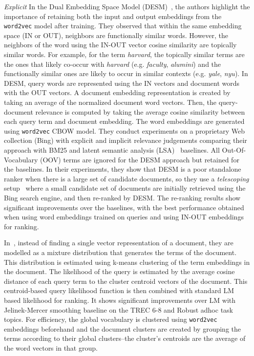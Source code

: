 \textit{Explicit} In the \textsf{Dual Embedding Space Model} (DESM)~\citep{Mitra2016a, Nalisnick:2016}, the authors highlight the importance of retaining both the input and output embeddings from the \texttt{word2vec} model after training. They observed that within the same embedding space (IN or OUT), neighbors are functionally similar words. However, the neighbors of the word using the IN-OUT vector cosine similarity are topically similar words. %
For example, for the term \textit{harvard}, the topically similar terms are the ones that likely co-occur with \textit{harvard} (e.g. \textit{faculty}, \textit{alumini}) and the functionally similar ones are likely to occur in similar contexts (e.g. \textit{yale}, \textit{nyu}). In DESM, query words are represented using the IN vectors and document words with the OUT vectors. A document embedding representation is created by taking an average of the normalized document word vectors. Then, the query-document relevance is computed by taking the average cosine similarity between each query term and document embedding. The word embeddings are generated using \texttt{word2vec} CBOW model. They conduct experiments on a proprietary Web collection (Bing) with explicit and implicit relevance judgements comparing their approach with BM25 and latent semantic analysis (LSA)~\citep{LSA} baselines. All Out-Of-Vocabulary (OOV) terms are ignored for the DESM approach but retained for the baselines. In their experiments, they show that DESM is a poor standalone ranker when there is a large set of candidate documents, so they use a \textit{telescoping} setup~\citep{Matveeva06} where a small candidate set of documents are initially retrieved using the Bing search engine, and then re-ranked by DESM. The re-ranking results show significant improvements over the baselines, with the best performance obtained when using word embeddings trained on queries and using IN-OUT embeddings for ranking.

In~\cite{RoyGMJ16}, instead of finding a single vector representation of a document, they are modelled as a mixture distribution that generates the terms of the document. This distribution is estimated using k-means clustering of the term embeddings in the document. The likelihood of the query is estimated by the average cosine distance of each query term to the cluster centroid vectors of the document. This centroid-based query likelihood function is then combined with standard LM based likelihood for ranking. It shows significant improvements over LM with Jelinek-Mercer smoothing baseline on the TREC 6-8 and Robust adhoc task topics. For efficiency, the global vocabulary is clustered using \texttt{word2vec} embeddings beforehand and the document clusters are created by grouping the terms according to their global clusters--the cluster's centroids are the average of the word vectors in that group. 

